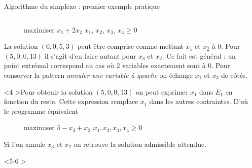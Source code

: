 \documentclass[aspectratio = 169]{beamer}
\begin{document}
\begin{frame}{Algorithme du simplexe : premier exemple pratique}
\begin{columns}
\begin{column}{.5\textwidth}
\begin{onlyenv}
\begin{figure}
{\begin{linearProg}{
                      maximiser
                    }{
                      $x_1 + 2x_2$
                    }{
                    }{
                      $x_1$, $x_2$, $x_3$, $x_4 \geq 0$
                    }
                  \end{linearProg}
                }
              \end{figure}
              La solution $(0, 0, 5, 3)$ peut être comprise comme
              mettant $x_1$ et $x_2$ à $0$. Pour $(5, 0, 0, 13)$ il
              s'agit d'en faire autant pour $x_3$ et $x_2$. \pause Ce
              fait est général : un point extrémal correspond au cas
              où $2$ variables exactement sont à $0$. \pause Pour
              conserver la pattern \textit{annuler une variable à
                gauche} on échange $x_1$ et $x_3$ de côtés.
            \end{onlyenv}
            \begin{onlyenv}<4
              >Pour obtenir la solution $(5, 0, 0, 13)$ on peut
              exprimer $x_1$ dans $E_1$ en fonction du reste. Cette
              expression remplace $x_1$ dans les autres contraintes.
              D'où le programme équivalent
                \begin{figure}
                  \small{
                    \begin{linearProg}{
                        maximiser
                      }{
                        $5 - x_3 + x_2$
                      }{
                      }{
                        $x_1, x_2, x_3, x_4 \geq 0$
                      }
                    \end{linearProg}
                  }
                \end{figure}
                Si l'on annule $x_3$ et $x_2$ on retrouve la solution
                admissible attendue.
            \end{onlyenv}
            \begin{onlyenv}<5-6
                >
\end{onlyenv}
\end{column}
\end{columns}
\end{frame}
\end{document}
